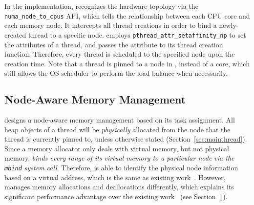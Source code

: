 In the implementation, \NA{} recognizes the hardware topology via the \texttt{numa\_node\_to\_cpus} API, which tells the relationship between each CPU core and each memory node. It intercepts all thread creations in order to bind a newly-created thread to a specific node. \NA{} employs \texttt{pthread\_attr\_setaffinity\_np} to set the attributes of a thread, and passes the attribute to its thread creation function. Therefore, every thread is scheduled to the specified node upon the creation time. Note that a thread is pinned to a node in \NM{}, instead of a core, which still allows the OS scheduler to perform the load balance when necessarily. 

\subsection{Node-Aware Memory Management} 
\label{sec:nodeaware-memory}

\NA{} designs a node-aware memory management based on its task assignment. All heap objects of a thread will be \textit{physically} allocated from the node that the thread is currently pinned to, unless otherwise stated (Section~\ref{sec:mainthread}). Since a memory allocator only deals with virtual memory, but not physical memory, \textit{\NA{} binds every range of its virtual memory to a particular node via the \texttt{mbind} system call}. Therefore, \NA{} is able to identify the physical node information based on a virtual address, which is the same as existing work~\cite{tcmallocnew}. However, \NA{} manages memory allocations and deallocations differently, which explains its significant performance advantage over the existing work~\cite{tcmallocnew} (see Section~\ref{}). 

